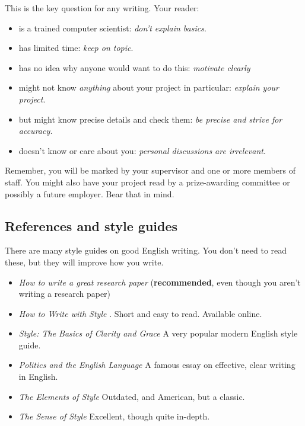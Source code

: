 \documentclass{l4proj}
\begin{document}
This is the key question for any writing. Your reader:

\begin{itemize}
    \item
    is a trained computer scientist: \emph{don't explain basics}.
    \item
    has limited time: \emph{keep on topic}.
    \item
    has no idea why anyone would want to do this: \emph{motivate clearly}
    \item
    might not know \emph{anything} about your project in particular:
    \emph{explain your project}.
    \item
    but might know precise details and check them: \emph{be precise and
    strive for accuracy.}
    \item
    doesn't know or care about you: \emph{personal discussions are
    irrelevant}.
\end{itemize}

Remember, you will be marked by your supervisor and one or more members
of staff. You might also have your project read by a prize-awarding
committee or possibly a future employer. Bear that in mind.

\subsection{References and style guides}
There are many style guides on good English writing. You don't need to
read these, but they will improve how you write.

\begin{itemize}
    \item
    \emph{How to write a great research paper} \cite{Pey17} (\textbf{recommended}, even though you aren't writing a research paper)
    \item
    \emph{How to Write with Style} \cite{Von80}. Short and easy to read. Available online.
    \item
    \emph{Style: The Basics of Clarity and Grace} \cite{Wil09} A very popular modern English style guide.
    \item
    \emph{Politics and the English Language} \cite{Orw68}  A famous essay on effective, clear writing in English.
    \item
    \emph{The Elements of Style} \cite{StrWhi07} Outdated, and American, but a classic.
    \item
    \emph{The Sense of Style} \cite{Pin15} Excellent, though quite in-depth.
\end{itemize}
\end{document}
